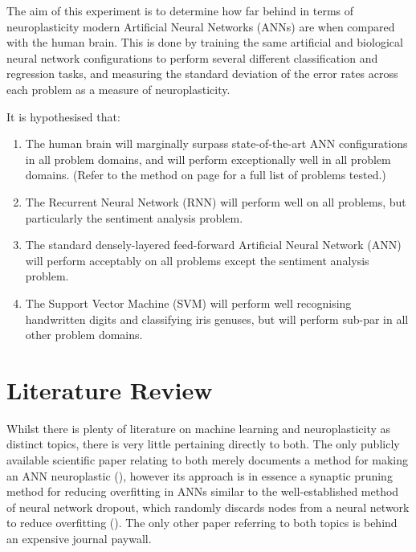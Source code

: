 \documentclass[]{report}
\begin{document}
The aim of this experiment is to determine how far behind in terms of neuroplasticity modern Artificial Neural Networks (ANNs) are when compared with the human brain. This is done by training the same artificial and biological neural network configurations to perform several different classification and regression tasks, and measuring the standard deviation of the error rates across each problem as a measure of neuroplasticity.

It is hypothesised that:
\begin{enumerate}
	\item The human brain will marginally surpass state-of-the-art ANN configurations in all problem domains, and will perform exceptionally well in all problem domains. (Refer to the method on page \pageref{itm:Method} for a full list of problems tested.)
	\item The Recurrent Neural Network (RNN) will perform well on all problems, but particularly the sentiment analysis problem.
	\item The standard densely-layered feed-forward Artificial Neural Network (ANN) will perform acceptably on all problems except the sentiment analysis problem.
	\item The Support Vector Machine (SVM) will perform well recognising handwritten digits and classifying iris genuses, but will perform sub-par in all other problem domains.
\end{enumerate}

\section{Literature Review}

Whilst there is plenty of literature on machine learning and neuroplasticity as distinct topics, there is very little pertaining directly to both. The only publicly available scientific paper relating to both merely documents a method for making an ANN neuroplastic (\cite{perwej12}), however its approach is in essence a synaptic pruning method for reducing overfitting in ANNs similar to the well-established method of neural network dropout, which randomly discards nodes from a neural network to reduce overfitting (\cite{dropout14}). The only other paper referring to both topics is behind an expensive journal paywall.
\end{document}
